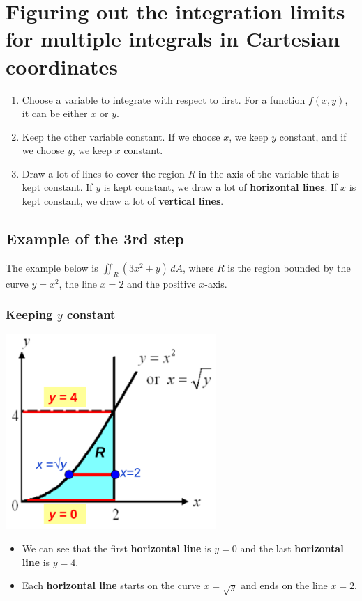 \documentclass[11pt]{article}
\begin{document}
 \newpage

\section{Figuring out the integration limits for multiple integrals in Cartesian coordinates}
\label{sec:org4637198}
\begin{enumerate}
\item Choose a variable to integrate with respect to first. For a function \(f(x, y)\), it can be either \(x\) or \(y\).
\item Keep the other variable constant. If we choose \(x\), we keep \(y\) constant, and if we choose \(y\), we keep \(x\) constant.
\item Draw a lot of lines to cover the region \(R\) in the axis of the variable that is kept constant. If \(y\) is kept constant, we draw a lot of \textbf{horizontal lines}. If \(x\) is kept constant, we draw a lot of \textbf{vertical lines}.
\end{enumerate}

\subsection{Example of the 3rd step}
\label{sec:org7bf772f}
The example below is \(\iint_R (3x^2 + y) \, dA\), where \(R\) is the region bounded by the curve \(y = x^2\), the line \(x = 2\) and the positive \(x\)-axis.

\subsubsection{Keeping \(y\) constant}
\label{sec:org1721306}
\begin{center}
\includegraphics[height=20em]{./images/double-integral-hold-y-constant.png}
\end{center}
\begin{itemize}
\item We can see that the first \textbf{horizontal line} is \(y = 0\) and the last \textbf{horizontal line} is \(y = 4\).
\item Each \textbf{horizontal line} starts on the curve \(x = \sqrt{y}\) and ends on the line \(x = 2\).
\end{itemize}
\end{document}
